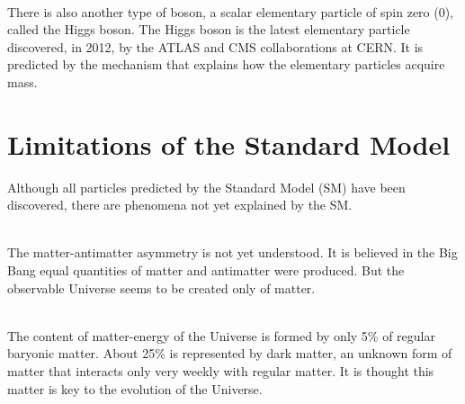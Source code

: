 \ \\There is also another type of boson, a scalar elementary particle of spin zero (0), called the Higgs boson. The Higgs boson is the latest elementary particle discovered, in 2012, by the ATLAS and CMS collaborations at CERN. It is predicted by the mechanism that explains how the elementary particles acquire mass.

\section{Limitations of the Standard Model}
\label{sec:SMLimitations}

Although all particles predicted by the Standard Model (SM) have been discovered, there are phenomena not yet explained by the SM. 

\ \\The matter-antimatter asymmetry is not yet understood. It is believed in the Big Bang equal quantities of matter and antimatter were produced. But the observable Universe seems to be created only of matter. 

\ \\The content of matter-energy of the Universe is formed by only 5\% of regular baryonic matter. About 25\% is represented by dark matter, an unknown form of matter that interacts only very weekly with regular matter. It is thought this matter is key to the evolution of the Universe.



